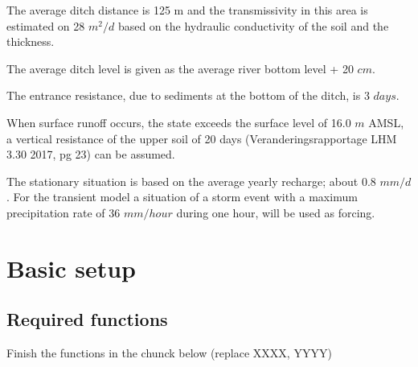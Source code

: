 \documentclass[
]{article}
\begin{document}
The average ditch distance is 125 m and the transmissivity in this area
is estimated on 28 \(m^2/d\) based on the hydraulic conductivity of the
soil and the thickness.

The average ditch level is given as the average river bottom level + 20
\(cm\).

The entrance resistance, due to sediments at the bottom of the ditch, is
3 \(days\).

When surface runoff occurs, the state exceeds the surface level of 16.0
\(m\) AMSL, a vertical resistance of the upper soil of 20 days
(Veranderingsrapportage LHM 3.30 2017, pg 23) can be assumed.

The stationary situation is based on the average yearly recharge; about
0.8 \(mm/d\). For the transient model a situation of a storm event with
a maximum precipitation rate of 36 \(mm/hour\) during one hour, will be
used as forcing.

\hypertarget{basic-setup}{%
\section{Basic setup}\label{basic-setup}}

\hypertarget{required-functions}{%
\subsection{Required functions}\label{required-functions}}

Finish the functions in the chunck below (replace XXXX, YYYY)
\end{document}
